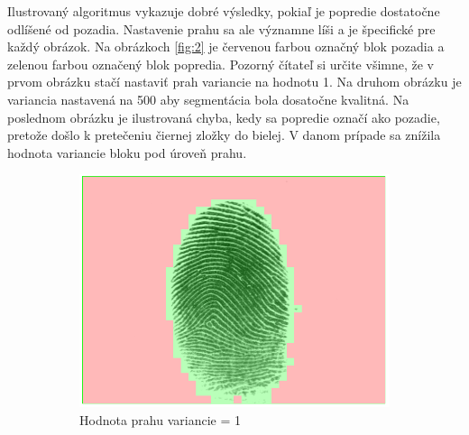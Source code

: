 \documentclass[11pt,a4paper]{article}
\begin{document}
Ilustrovaný algoritmus vykazuje dobré výsledky, pokiaľ je popredie dostatočne odlíšené od pozadia. Nastavenie prahu sa ale významne líši a je špecifické pre každý obrázok. Na obrázkoch \ref{fig:2} je červenou farbou označný blok pozadia a zelenou farbou označený blok popredia. Pozorný čítateľ si určite všimne, že v prvom obrázku stačí nastaviť prah variancie na hodnotu 1. Na druhom obrázku je variancia nastavená na 500 aby segmentácia bola dosatočne kvalitná. Na poslednom obrázku je ilustrovaná chyba, kedy sa popredie označí ako pozadie, pretože došlo k pretečeniu čiernej zložky do bielej. V danom prípade sa znížila hodnota variancie bloku pod úroveň prahu.

\begin{figure}[h!]
	\centering
	\begin{subfigure}{0.33\textwidth}
		\centering
		\includegraphics[width=.95\linewidth]{images/Screenshot_5}
		\caption{Hodnota prahu variancie = 1}
		\label{fig:gull}
	\end{subfigure}%
	\begin{subfigure}{0.33\textwidth}
		\centering

\end{subfigure}
\end{figure}
\end{document}
